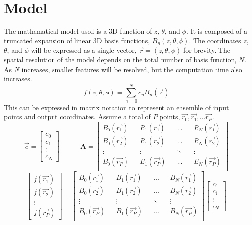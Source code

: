 \documentclass[12pt,letterpaper]{article}
\newcommand{\mat}[1]{\mathbf{#1}}
\begin{document}
\section{Model}
  The mathematical model used is a 3D function of \(z\), \(\theta\), and \(\phi\).  It is composed of a truncated expansion of linear 3D basis functions, \(B_n(z,\theta,\phi)\).  The coordinates \(z\), \(\theta\), and \(\phi\) will be expressed as a single vector, \(\vec{r} = (z,\theta,\phi)\) for brevity.  The spatial resolution of the model depends on the total number of basis function, \(N\).  As \(N\) increases, smaller features will be resolved, but the computation time also increases.
  \[f(z,\theta,\phi) = \sum_{n=0}^N c_n B_n(\vec{r})\]
  This can be expressed in matrix notation to represent an ensemble of input points and output coordinates.  Assume a total of \(P\) points, \(\vec{r_0}, \vec{r_1}, \hdots \vec{r_P}\).
  \begin{equation}
    \label{eqn:defcA}
    \vec{c} = \begin{bmatrix}
                c_0 \\
                c_1 \\
                \vdots \\
                c_N
              \end{bmatrix} \quad\quad\quad
    \mat{A} = \begin{bmatrix}
                B_0(\vec{r_1}) && B_1(\vec{r_1}) && \hdots && B_N(\vec{r_1}) \\
                B_0(\vec{r_2}) && B_1(\vec{r_2}) && \hdots && B_N(\vec{r_2}) \\
                \vdots && \vdots && \ddots && \vdots \\
                B_0(\vec{r_P}) && B_1(\vec{r_P}) && \hdots && B_N(\vec{r_P}) \\
              \end{bmatrix}
  \end{equation}
  \begin{equation}
    \begin{bmatrix}
      f(\vec{r_1}) \\
      f(\vec{r_2}) \\
      \vdots \\
      f(\vec{r_P})
    \end{bmatrix} =
    \begin{bmatrix}
      B_0(\vec{r_1}) && B_1(\vec{r_1}) && \hdots && B_N(\vec{r_1}) \\
      B_0(\vec{r_2}) && B_1(\vec{r_2}) && \hdots && B_N(\vec{r_2}) \\
      \vdots && \vdots && \ddots && \vdots \\
      B_0(\vec{r_P}) && B_1(\vec{r_P}) && \hdots && B_N(\vec{r_P}) \\
    \end{bmatrix}
    \begin{bmatrix}
      c_0 \\
      c_1 \\
      \vdots \\
      c_N
    \end{bmatrix}
  \end{equation}
\end{document}
